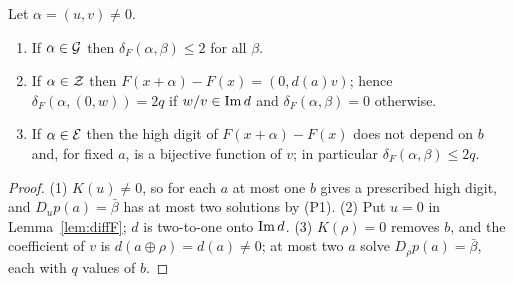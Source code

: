 \begin{proposition}[Rows of $T_F$]\label{prop:F-rows}
Let $\alpha=(u,v)\ne0$.
\begin{enumerate}
\item If $\alpha\in\mathcal{G}$ then $\delta_F(\alpha,\beta)\le2$ for all $\beta$.
\item If $\alpha\in\mathcal{Z}$ then $F(x+\alpha)-F(x)=(0,d(a)v)$; hence $\delta_F(\alpha,(0,w))=2q$ if
$w/v\in\mathrm{Im}\, d$ and $\delta_F(\alpha,\beta)=0$ otherwise.
\item If $\alpha\in\mathcal{E}$ then the high digit of $F(x+\alpha)-F(x)$ does not depend on $b$ and, for fixed $a$, is a bijective function of $v$; in particular $\delta_F(\alpha,\beta)\le2q$.
\end{enumerate}
\end{proposition}
\begin{proof}
(1) $K(u)\ne0$, so for each $a$ at most one $b$ gives a prescribed high digit, and $D_up(a)=\bar\beta$
has at most two solutions by (P1). (2) Put $u=0$ in Lemma~\ref{lem:diffF}; $d$ is two-to-one onto
$\mathrm{Im}\, d$. (3) $K(\rho)=0$ removes $b$, and the coefficient of $v$ is $d(a\oplus\rho)=d(a)\ne0$; at most two $a$
solve $D_\rho p(a)=\bar\beta$, each with $q$ values of $b$.
\end{proof}

